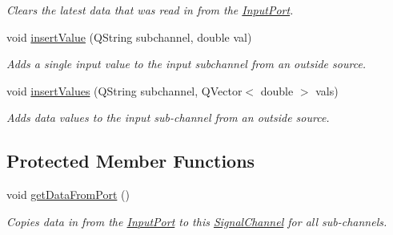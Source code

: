 \begin{DoxyCompactItemize}
\begin{DoxyCompactList}\small\item\em Clears the latest data that was read in from the \hyperlink{class_picto_1_1_input_port}{Input\-Port}. \end{DoxyCompactList}\item 
void \hyperlink{class_picto_1_1_signal_channel_adafa510c5afd2ef630777181d0fac523}{insert\-Value} (Q\-String subchannel, double val)
\begin{DoxyCompactList}\small\item\em Adds a single input value to the input subchannel from an outside source. \end{DoxyCompactList}\item 
void \hyperlink{class_picto_1_1_signal_channel_a14f7b5e24440a75104ed0540371f2f7b}{insert\-Values} (Q\-String subchannel, Q\-Vector$<$ double $>$ vals)
\begin{DoxyCompactList}\small\item\em Adds data values to the input sub-\/channel from an outside source. \end{DoxyCompactList}\end{DoxyCompactItemize}
\subsection*{Protected Member Functions}
\begin{DoxyCompactItemize}
\item 
void \hyperlink{class_picto_1_1_signal_channel_ab36c2e645b71df0e11eabe31d468ad85}{get\-Data\-From\-Port} ()
\begin{DoxyCompactList}\small\item\em Copies data in from the \hyperlink{class_picto_1_1_input_port}{Input\-Port} to this \hyperlink{class_picto_1_1_signal_channel}{Signal\-Channel} for all sub-\/channels. \end{DoxyCompactList}\end{DoxyCompactItemize}
